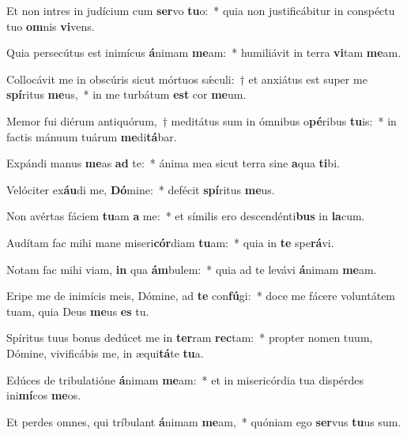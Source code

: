 \item Et non intres in judícium cum \textbf{ser}vo \textbf{tu}o:~* quia non justificábitur in conspéctu tuo \textbf{om}nis \textbf{vi}vens.
\item Quia persecútus est inimícus \textbf{á}nimam \textbf{me}am:~* humiliávit in terra \textbf{vi}tam \textbf{me}am.
\item Collocávit me in obscúris sicut mórtuos sǽculi:~† et anxiátus est super me \textbf{spí}ritus \textbf{me}us,~* in me turbátum \textbf{est} cor \textbf{me}um.
\item Memor fui diérum antiquórum,~† meditátus sum in ómnibus o\textbf{pé}ribus \textbf{tu}is:~* in factis mánuum tuárum \textbf{me}di\textbf{tá}bar.
\item Expándi manus \textbf{me}as \textbf{ad} te:~* ánima mea sicut terra sine \textbf{a}qua \textbf{ti}bi.
\item Velóciter ex\textbf{áu}di me, \textbf{Dó}mine:~* defécit \textbf{spí}ritus \textbf{me}us.
\item Non avértas fáciem \textbf{tu}am \textbf{a} me:~* et símilis ero descendénti\textbf{bus} in \textbf{la}cum.
\item Audítam fac mihi mane miseri\textbf{cór}diam \textbf{tu}am:~* quia in \textbf{te} spe\textbf{rá}vi.
\item Notam fac mihi viam, \textbf{in} qua \textbf{ám}bulem:~* quia ad te levávi \textbf{á}nimam \textbf{me}am.
\item Eripe me de inimícis meis, Dómine, ad \textbf{te} con\textbf{fú}gi:~* doce me fácere voluntátem tuam, quia Deus \textbf{me}us \textbf{es} tu.
\item Spíritus tuus bonus dedúcet me in \textbf{ter}ram \textbf{rec}tam:~* propter nomen tuum, Dómine, vivificábis me, in æqui\textbf{tá}te \textbf{tu}a.
\item Edúces de tribulatióne \textbf{á}nimam \textbf{me}am:~* et in misericórdia tua dispérdes ini\textbf{mí}cos \textbf{me}os.
\item Et perdes omnes, qui tríbulant \textbf{á}nimam \textbf{me}am,~* quóniam ego \textbf{ser}vus \textbf{tu}us sum.

